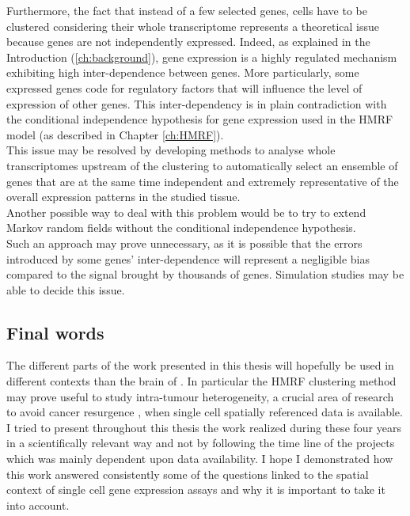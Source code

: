   Furthermore, the fact that instead of a few selected genes, cells have to be clustered considering their whole transcriptome represents a theoretical issue because genes are not independently expressed. Indeed, as explained in the Introduction (\ref{ch:background}), gene expression is a highly regulated mechanism exhibiting high inter-dependence between genes. More particularly, some expressed genes code for regulatory factors that will influence the level of expression of other genes. This inter-dependency is in plain contradiction with the conditional independence hypothesis for gene expression used in the HMRF model (as described in Chapter \ref{ch:HMRF}).\\
  
  This issue may be resolved by developing methods to analyse whole transcriptomes upstream of the clustering to automatically select an ensemble of genes that are at the same time independent and extremely representative of the overall expression patterns in the studied tissue.\\
  
  Another possible way to deal with this problem would be to try to extend Markov random fields without the conditional independence hypothesis.\\
  
   Such an approach may prove unnecessary, as it is possible that the errors introduced by some genes' inter-dependence will represent a negligible bias compared to the signal brought by thousands of genes. Simulation studies may be able to decide this issue. 
   
\subsection{Final words}
    The different parts of the work presented in this thesis will hopefully be used in different contexts than the brain of \platy{}. In particular the HMRF clustering method may prove useful to study intra-tumour heterogeneity, a crucial area of research to avoid cancer resurgence \citep{meacham13,marusyk12,beckmann97}, when single cell spatially referenced data is available.\\
    
I tried to present throughout this thesis the work realized during these four years in a scientifically relevant way and not by following the time line of the projects which was mainly dependent upon data availability. I hope I demonstrated how this work answered consistently some of the questions linked to the spatial context of single cell gene expression assays and why it is important to take it into account.\\







	



